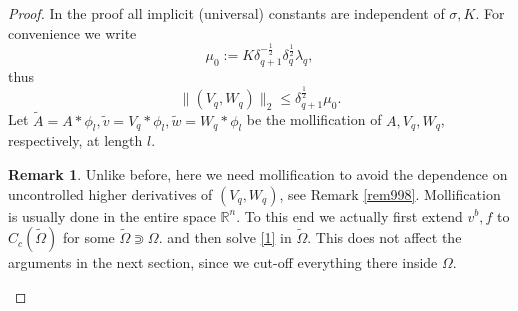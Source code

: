 \documentclass[reqno,12pt]{amsart}
\numberwithin{equation}{section}
\theoremstyle{plain}
\theoremstyle{definition}
\newtheorem{rem}[thm]{Remark}
\newcommand{\R}{\mathbb{R}}
\begin{document}
\begin{proof}
In the proof all implicit (universal) constants are independent of $\sigma,K$. For convenience we write
\begin{equation}\label{mu0}
    \mu_0:=K\delta_{q+1}^{-\frac{1}{2}}\delta_q^\frac{1}{2}\lambda_q,
\end{equation}
thus
\begin{equation}\label{prop1.a2'}
    \|(V_q,W_q)\|_2\le \delta_{q+1}^\frac{1}{2}\mu_0.
\end{equation}
Let $\tilde A=A*\phi_l,\tilde v=V_q*\phi_l,\tilde w=W_q*\phi_l$ be the mollification of $A,V_q,W_q$, respectively, at length $l$. 
\begin{rem}
    Unlike before, here we need mollification to avoid the dependence on uncontrolled higher derivatives of $(V_q,W_q)$, see Remark \ref{rem998}. Mollification is usually done in the entire space $\R^n$. To this end we actually first extend $v^b,f$ to $C_c(\tilde\Omega)$ for some $\tilde\Omega\Supset\Omega$. and then solve \eqref{1} in $\tilde\Omega$. This does not affect the arguments in the next section, since we cut-off everything there inside $\Omega$.


\end{rem}
\end{proof}
\end{document}
